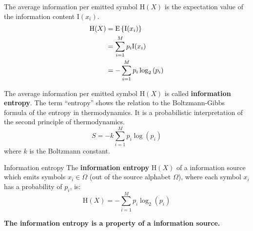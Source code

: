 \begin{refsection}
The average information per emitted symbol $\mathrm{H}(X)$ is the expectation value of the information content $\mathrm{I}(x_i)$.
\begin{equation}
	\begin{split}
		\mathrm{H}(X) &= \mathrm{E}\left\{\mathrm{I}(x_i)\right\} \\
		 &= \sum\limits_{i=1}^{M} p_i \mathrm{I}(x_i) \\
		 &= - \sum\limits_{i=1}^{M} p_i \log_2 \left(p_i\right)
	\end{split}
\end{equation}

The average information per emitted symbol $\mathrm{H}(X)$ is called  \textbf{information entropy}. The term ``entropy'' shows the relation to the Boltzmann-Gibbs formula of the entropy in thermodynamics. It is a probabilistic interpretation of the second principle of thermodynamics.
\begin{equation}
	S = - k \sum\limits_{i=1}^{M} p_i \log \left(p_i\right)
\end{equation}
where $k$ is the Boltzmann constant.

\begin{definition}{Information entropy}
	The  \textbf{information entropy} $\mathrm{H}(X)$ of a information source which emits symbols $x_i \in \Omega$ (out of the source alphabet $\Omega$), where each symbol $x_i$ has a probability of $p_i$, is:
	\begin{equation}
		\mathrm{H}(X) = - \sum\limits_{i=1}^{M} p_i \log_2 \left(p_i\right)
		\label{eq:ch08:infoentropy}
	\end{equation}

	\textbf{The information entropy is a property of a information source.}
\end{definition}


\end{refsection}
